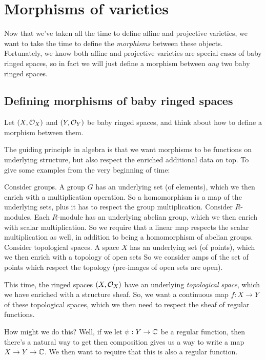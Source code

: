 \chapter{Morphisms of varieties}
Now that we've taken all the time to define affine and projective varieties,
we want to take the time to define the \emph{morphisms} between these objects.
Fortunately, we know both affine and projective varieties are special
cases of baby ringed spaces, so in fact we will just define a morphism
between \emph{any} two baby ringed spaces.

\section{Defining morphisms of baby ringed spaces}
Let $(X, \mathcal O_X)$ and $(Y, \mathcal O_Y)$ be baby ringed spaces, and think
about how to define a morphism between them.

The guiding principle in algebra is that we want morphisms
to be functions on underlying structure, but also respect
the enriched additional data on top.
To give some examples from the very beginning of time:
\begin{example}
	\listhack
	\begin{itemize}
	\ii Consider groups.
	A group $G$ has an underlying set (of elements),
	which we then enrich with a multiplication operation.
	So a homomorphism is a map of the underlying sets,
	plus it has to respect the group multiplication.
	\ii Consider $R$-modules.
	Each $R$-module has an underlying abelian group,
	which we then enrich with scalar multiplication.
	So we require that a linear map respects the scalar multiplication as well,
	in addition to being a homomorphism of abelian groups.
	\ii Consider topological spaces.
	A space $X$ has an underlying set (of points),
	which we then enrich with a topology of open sets
	So we consider amps of the set of points
	which respect the topology (pre-images of open sets are open).
	\end{itemize}
\end{example}
This time, the ringed spaces $(X, \mathcal O_X)$ have an underlying
\emph{topological space}, which we have enriched with a structure sheaf.
So, we want a continuous map $f : X \to Y$ of these topological spaces,
which we then need to respect the sheaf of regular functions.

How might we do this? Well, if we let $\psi : Y \to \mathbb C$
be a regular function, then there's a natural way to get
then composition gives us a way to write a map $X \to Y \to \mathbb C$.
We then want to require that this is also a regular function.

